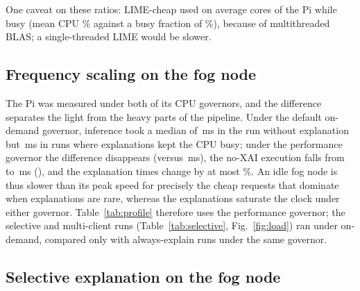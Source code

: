 \documentclass[conference]{IEEEtran}
\newcommand{\ms}{\,ms\xspace}
\begin{document}
One caveat on these ratios: LIME-cheap used on
average \FogLimeCCores cores of the Pi while busy (mean CPU \FogLimeCCPU\%
against a busy fraction of \FogLimeCBusy\%), because of multithreaded BLAS;
a single-threaded LIME would be slower.

\subsection{Frequency scaling on the fog node}
\label{sec:res-gov}

The Pi was measured under both of its CPU governors, and the difference
separates the light from the heavy parts of the pipeline.
Under the default on-demand governor, inference took a median of
\FogInfIdle\ms in the run without explanation but \FogInfBusy\ms in runs
where explanations kept the CPU busy; under the performance governor the
difference disappears (\FogInfPerf versus \FogInfBusyPerf\ms), the no-XAI
execution falls from \FogODNoneExecMed to \FogNoneExecMed\ms
(\FogGovGain\x), and the explanation times change by at most
\FogGovXaiLimeC\%. An idle fog node is thus slower than its peak speed for
precisely the cheap requests that dominate when explanations are rare,
whereas the explanations saturate the clock under either governor.
Table~\ref{tab:profile} therefore uses the performance governor; the
selective and multi-client runs (Table~\ref{tab:selective},
Fig.~\ref{fig:load}) ran under on-demand, compared only with
always-explain runs under the same governor.

\subsection{Selective explanation on the fog node}
\label{sec:res-selective}
\end{document}
